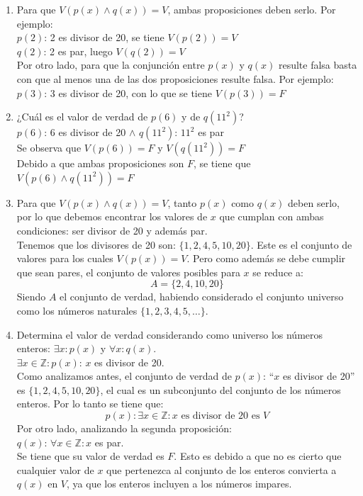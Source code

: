 \documentclass[12pt]{article}
\begin{document}
\begin{enumerate}[label=\roman*)]
    \item Para que $V(p(x) \wedge q(x)) = V$, ambas proposiciones deben serlo. Por ejemplo:\\
    $p(2)$: 2 es divisor de 20, se tiene $V(p(2)) = V$\\
    $q(2)$: 2 es par, luego $V(q(2)) = V$\\[0.3em]
    Por otro lado, para que la conjunción entre $p(x)$ y $q(x)$ resulte falsa basta con que al menos una de las dos proposiciones resulte falsa. Por ejemplo:\\
    $p(3)$: 3 es divisor de 20, con lo que se tiene $V(p(3)) = F$

    \item ¿Cuál es el valor de verdad de $p(6)$ y de $q(11^2)$?\\
    $p(6)$: 6 es divisor de 20 \quad $\wedge$ \quad $q(11^2)$: $11^2$ es par\\
    Se observa que $V(p(6)) = F$ y $V(q(11^2)) = F$\\
    Debido a que ambas proposiciones son $F$, se tiene que $V(p(6) \wedge q(11^2)) = F$

    \item Para que $V(p(x) \wedge q(x)) = V$, tanto $p(x)$ como $q(x)$ deben serlo, por lo que debemos encontrar los valores de $x$ que cumplan con ambas condiciones: ser divisor de 20 y además par.\\[0.3em]
    Tenemos que los divisores de 20 son: $\{1, 2, 4, 5, 10, 20\}$. Este es el conjunto de valores para los cuales $V(p(x)) = V$. Pero como además se debe cumplir que sean pares, el conjunto de valores posibles para $x$ se reduce a:
    \[A = \{2, 4, 10, 20\}\]
    Siendo $A$ el conjunto de verdad, habiendo considerado el conjunto universo como los números naturales $\{1, 2, 3, 4, 5, \ldots\}$.

    \item Determina el valor de verdad considerando como universo los números enteros: $\exists x: p(x)$ y $\forall x: q(x)$.\\[0.3em]
    $\exists x \in \mathbb{Z}: p(x)$: $x$ es divisor de 20.\\
    Como analizamos antes, el conjunto de verdad de $p(x)$: ``$x$ es divisor de 20'' es $\{1, 2, 4, 5, 10, 20\}$, el cual es un subconjunto del conjunto de los números enteros. Por lo tanto se tiene que:
    \[p(x): \exists x \in \mathbb{Z}: x \text{ es divisor de 20 es } V\]
    Por otro lado, analizando la segunda proposición:\\
    $q(x)$: $\forall x \in \mathbb{Z}: x$ es par.\\
    Se tiene que su valor de verdad es $F$. Esto es debido a que no es cierto que cualquier valor de $x$ que pertenezca al conjunto de los enteros convierta a $q(x)$ en $V$, ya que los enteros incluyen a los números impares.
\end{enumerate}
\end{document}
